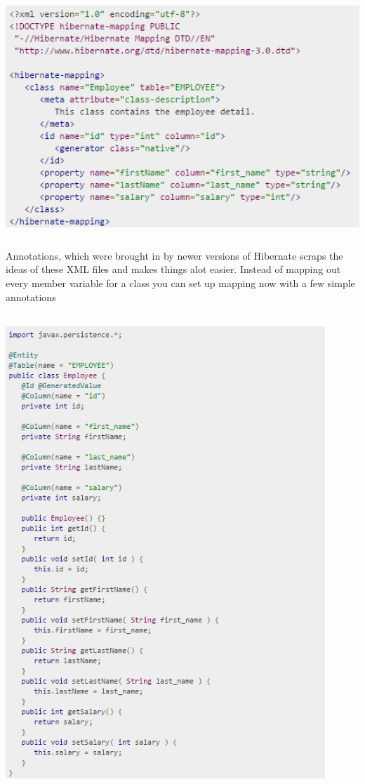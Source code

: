 \begin{center}    
	\includegraphics[height=9cm, width=14cm]{img/hibernatemapping.png}
\end{center}

Annotations, which were brought in by newer versions of Hibernate scraps the ideas of these XML files and makes things alot easier. Instead of mapping out every member variable for a class you can set up mapping now with a few simple annotations

\begin{center}    
	\includegraphics[height=18cm, width=12cm]{img/hibernateclass.png}
\end{center}

